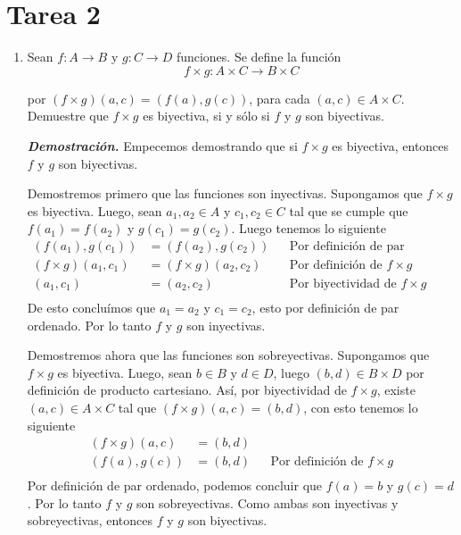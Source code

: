 \documentclass{report}
\begin{document}

\pagebreak
\section*{ Tarea 2 }

\begin{enumerate}
    \item Sean $f: A \to B$ y $g: C \to D$ funciones. Se define la función
        $$
            f \times g: A \times C \to B \times C
        $$

        por $(f \times g)(a,c) = (f(a), g(c))$, para cada $(a,c) \in A \times C$. Demuestre que $f \times g$ es biyectiva, si y sólo si $f$ y $g$ son biyectivas.

        \textit{\textbf{Demostración.}} Empecemos demostrando que si $f\times g$ es biyectiva, entonces $f$ y $g$ son biyectivas.

        Demostremos primero que las funciones son inyectivas. Supongamos que $f \times g$ es biyectiva. Luego, sean $a_1, a_2 \in A$ y $c_1, c_2 \in C$ tal que se cumple que $f(a_1)=f(a_2)$ y $g(c_1)=g(c_2)$. Luego tenemos lo siguiente
        \begin{align*}
        (f(a_1), g(c_1)) &= (f(a_2), g(c_2)) &&\text{Por definición de par ordenado.}\\
        (f \times g)(a_1,c_1) &= (f \times g)(a_2,c_2)  &&\text{Por definición de } f \times g\\
        (a_1,c_1) &= (a_2,c_2) && \text{Por biyectividad de } f \times g\\
        \end{align*}
        De esto concluímos que $a_1 = a_2$ y $c_1 = c_2$, esto por definición de par ordenado. Por lo tanto $f$ y $g$ son inyectivas.

        Demostremos ahora que las funciones son sobreyectivas. Supongamos que $f \times g$ es biyectiva. Luego, sean $b \in B$ y $d \in D$, luego $(b,d) \in B \times D$ por definición de producto cartesiano. Así, por biyectividad de $f \times g$, existe $(a,c) \in A \times C$ tal que $(f \times g)(a,c) = (b,d)$, con esto tenemos lo siguiente
        \begin{align*}
        (f \times g)(a,c) &= (b,d)\\
        (f(a), g(c)) &= (b,d) &&\text{Por definición de } f \times g\\
        \end{align*}
        Por definición de par ordenado, podemos concluir que $f(a) = b$ y $g(c) = d$. Por lo tanto $f$ y $g$ son sobreyectivas. Como ambas son inyectivas y sobreyectivas, entonces $f$ y $g$ son biyectivas.


\end{enumerate}
\end{document}
